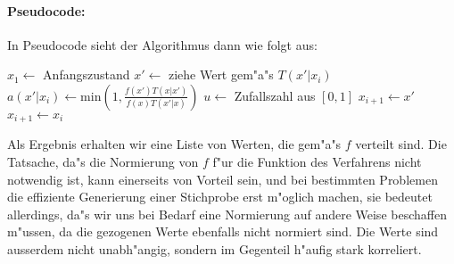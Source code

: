 	
	
	\paragraph{Pseudocode:}
	In Pseudocode sieht der Algorithmus dann wie folgt aus:
	\begin{algorithmic}
		\STATE $x_1 \leftarrow$ Anfangszustand
			\STATE $x'\leftarrow$ ziehe Wert gem"a"s $T(x'|x_i)$
			\STATE $a(x'|x_i) \leftarrow \text{min}\left(1, \frac{f(x')T(x|x')}{f(x)T(x'|x)}\right)$
			\STATE $u\leftarrow$ Zufallszahl aus $[0,1]$
				\STATE $x_{i+1} \leftarrow x'$
			\ELSE	\STATE $x_{i+1} \leftarrow x_i$
			\ENDIF
	  \ENDFOR
	\end{algorithmic}
	Als Ergebnis erhalten wir eine Liste von Werten, die gem"a"s $f$ verteilt sind.
	Die Tatsache, da"s die Normierung von $f$ f"ur die Funktion des Verfahrens nicht notwendig ist, kann einerseits von Vorteil sein, und bei bestimmten Problemen die effiziente Generierung einer Stichprobe erst m"oglich machen, sie bedeutet allerdings, da"s wir uns bei Bedarf eine Normierung auf andere Weise beschaffen m"ussen, da die gezogenen Werte ebenfalls nicht normiert sind. Die Werte sind ausserdem nicht unabh"angig, sondern im Gegenteil h"aufig stark korreliert.

